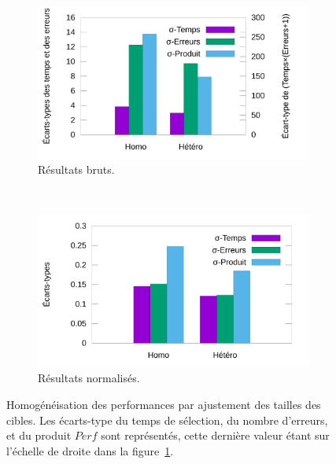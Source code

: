 	\begin{figure}[!htb]
		\begin{subfigure}[t]{0.49\textwidth}
			\centering
			\includegraphics[width=\textwidth]{figures/ch5/homogeneityHistogram}
			\caption{Résultats bruts.}
			\label{fig:homogeneityHistogram}
		\end{subfigure}
		~
		\begin{subfigure}[t]{0.49\textwidth}
			\centering
			\includegraphics[width=\textwidth]{figures/ch5/normHomogeneityHistogram}
			\caption{Résultats normalisés.}
			\label{fig:normHomogeneityHistogram}
		\end{subfigure}
		\caption[Homogénéisation des performances]{Homogénéisation des performances par ajustement des tailles des cibles. Les écarts-type du temps de sélection, du nombre d'erreurs, et du produit $Perf$ sont représentés, cette dernière valeur étant sur l'échelle de droite dans la figure~\ref{fig:homogeneityHistogram}.}
		\label{fig:homoHistosNormAndRaw}
	\end{figure}
	
